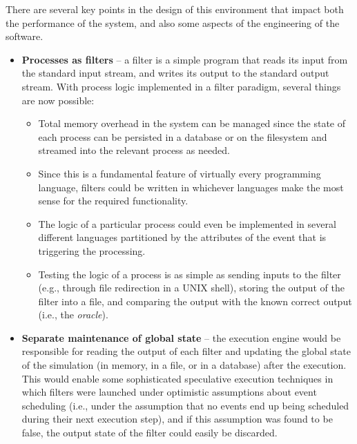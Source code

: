 \documentclass[10pt,notitlepage]{article}
\begin{document}
There are several key points in the design of this environment that
impact both the performance of the system, and also some aspects of
the engineering of the software.
\begin{itemize}
  \item{\textbf{Processes as filters} -- a filter is a simple program
    that reads its input from the standard input stream, and writes
    its output to the standard output stream.  With process logic
    implemented in a filter paradigm, several things are now possible:
    \begin{itemize}
    \item{Total memory overhead in the system can be managed since the
      state of each process can be persisted in a database or on the
      filesystem and streamed into the relevant process as needed.}

    \item{Since this is a fundamental feature of virtually every
      programming language, filters could be written in whichever
      languages make the most sense for the required functionality.}

    \item{The logic of a particular process could even be implemented
      in several different languages partitioned by the attributes of
      the event that is triggering the processing.}
      
    \item{Testing the logic of a process is as simple as sending
      inputs to the filter (e.g., through file redirection in a UNIX
      shell), storing the output of the filter into a file, and
      comparing the output with the known correct output (i.e., the
      \emph{oracle}).}

    \end{itemize}}

  \item{\textbf{Separate maintenance of global state} -- the execution
    engine would be responsible for reading the output of each filter
    and updating the global state of the simulation (in memory, in a
    file, or in a database) after the execution.  This would enable
    some sophisticated speculative execution techniques in which
    filters were launched under optimistic assumptions about event
    scheduling (i.e., under the assumption that no events end up being
    scheduled during their next execution step), and if this
    assumption was found to be false, the output state of the filter
    could easily be discarded.}


\end{itemize}
\end{document}
